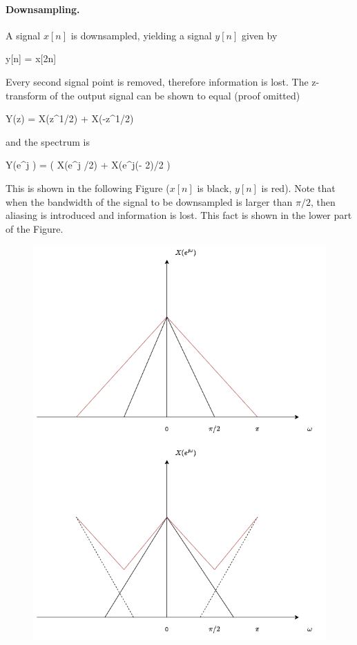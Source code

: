 \paragraph{Downsampling.} A signal $x[n]$ is downsampled, yielding a signal $y[n]$ given by

\bee
y[n] = x[2n]
\eee

Every second signal point is removed, therefore information is lost. The z-transform of the output signal can be shown to equal (proof omitted)

\bee
Y(z) =  X(z^{1/2}) +  X(-z^{1/2})
\eee

and the spectrum is

\bee
Y(e^{j \omega}) =  \left( X(e^{j \omega/2}) + X(e^{j(\omega - 2\pi)/2} \right)
\eee

This is shown in the following Figure ($x[n]$ is black, $y[n]$ is red). Note that when the bandwidth of the signal to be downsampled is larger than $\pi/2$, then aliasing is introduced and information is lost. This fact is shown in the lower part of the Figure.

\begin{figure}[H]
    \centering
    \includegraphics[scale=0.5]{images/2021-11-09-subband_06.png}
\end{figure}


